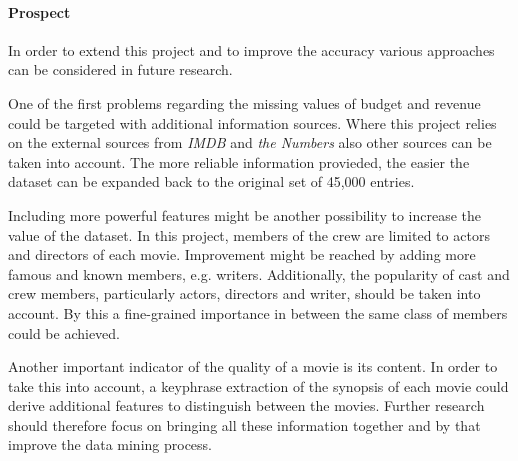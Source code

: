 \paragraph{Prospect}
In order to extend this project and to improve the accuracy various approaches can be considered in future research. 

One of the first problems regarding the missing values of budget and revenue could be targeted with additional information sources. Where this project relies on the external sources from \textit{IMDB } and \textit{the Numbers} also other sources can be taken into account. The more reliable information provieded, the easier the dataset can be expanded back to the original set of 45,000 entries.

\normalsize Including more powerful features might be another possibility to increase the value of the dataset. In this project, members of the crew are limited to actors and directors of each movie. Improvement might be reached by adding more famous and known members, e.g. writers. Additionally, the popularity of cast and crew members, particularly actors, directors and writer, should be taken into account. By this a fine-grained importance in between the same class of members could be achieved.

Another important indicator of the quality of a movie is its content. In order to take this into account, a keyphrase extraction of the synopsis of each movie could derive additional features to distinguish between the movies. Further research should therefore focus on bringing all these information together and by that improve the data mining process.

%
